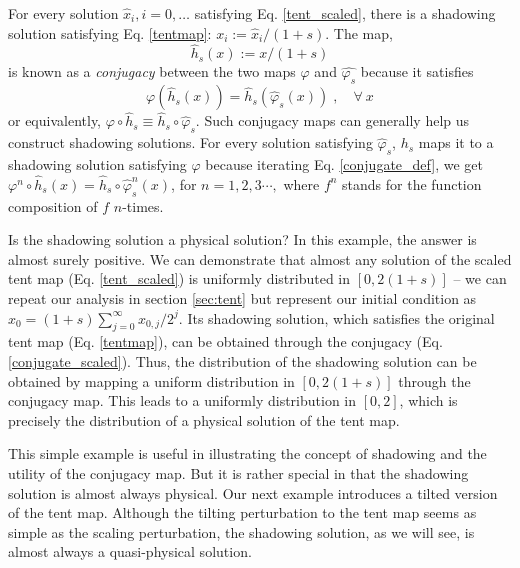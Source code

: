 For every solution $\hat{x}_i,i=0,\ldots$ satisfying Eq. \ref{tent_scaled}, there is a shadowing solution satisfying Eq. \ref{tentmap}: $x_i:= \hat{x}_i/(1+s)$.  The map,
\begin{equation} \label{conjugate_scaled}
    \hat{h}_s(x):=x/(1+s)
\end{equation}
is known as a \emph{conjugacy} between the two maps $\varphi$ and $\hat{\varphi_s}$ 
because it satisfies
\begin{equation} \label{conjugate_def}
    \varphi(\hat{h}_s(x)) = \hat{h}_s(\hat\varphi_s(x))\;,\quad \forall\: x
\end{equation}
or equivalently, $\varphi\circ \hat{h}_s \equiv \hat{h}_s\circ\hat\varphi_s$.
Such conjugacy maps can generally help us construct shadowing solutions.
For every solution satisfying
$\hat{\varphi}_s$, $h_s$ maps it to a shadowing solution satisfying $\varphi$ because iterating Eq. \ref{conjugate_def}, we get $\varphi^n \circ \hat{h}_s (x) = \hat{h}_s \circ \hat{\varphi}_s^n(x)$, for $n = 1,2,3\cdots, $ where $f^n$ stands for the function composition of $f$ $n$-times.

Is the shadowing solution a physical solution?  In this example,
the answer is almost surely positive.  We can demonstrate that
almost any solution of the scaled tent map (Eq. \ref{tent_scaled}) is uniformly
distributed in $[0, 2(1+s)]$ -- we can repeat our analysis
in section \ref{sec:tent} but represent our initial condition as
$x_0= (1+s) \sum_{j=0}^\infty x_{0,j} / 2^j$.  Its shadowing solution,
which satisfies the original tent map (Eq. \ref{tentmap}), can be obtained through the
conjugacy (Eq. \ref{conjugate_scaled}).  Thus, the distribution
of the shadowing solution can be obtained by mapping a uniform
distribution in $[0,2(1+s)]$ through the conjugacy map.
This leads to a uniformly distribution in $[0,2]$, which is
precisely the distribution of a physical solution of the tent map.

This simple example is useful in illustrating the concept of shadowing
and the utility of the conjugacy map.  But it is rather special
in that the shadowing solution is almost always physical.  Our next
example introduces a tilted version of the tent map.  Although
the tilting perturbation to the tent map seems as simple as the
scaling perturbation, the shadowing solution, as we will see,
is almost always a quasi-physical solution.

